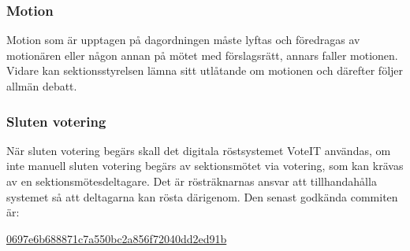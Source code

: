 \subsubsection{Motion}
Motion som är upptagen på dagordningen måste lyftas och föredragas av motionären eller någon annan på mötet med förslagsrätt, annars faller motionen. Vidare kan sektionsstyrelsen lämna sitt utlåtande om motionen och därefter följer allmän debatt.

\subsubsection{Sluten votering}
När sluten votering begärs skall det digitala röstsystemet VoteIT användas, om inte manuell sluten votering begärs av sektionsmötet via votering, som kan krävas av en sektionsmötesdeltagare. Det är rösträknarnas ansvar att tillhandahålla systemet så att deltagarna kan rösta därigenom. Den senast godkända commiten är:

\href{https://github.com/cthit/VoteIT/commit/0697e6b688871c7a550bc2a856f72040dd2ed91b}{0697e6b688871c7a550bc2a856f72040dd2ed91b}
